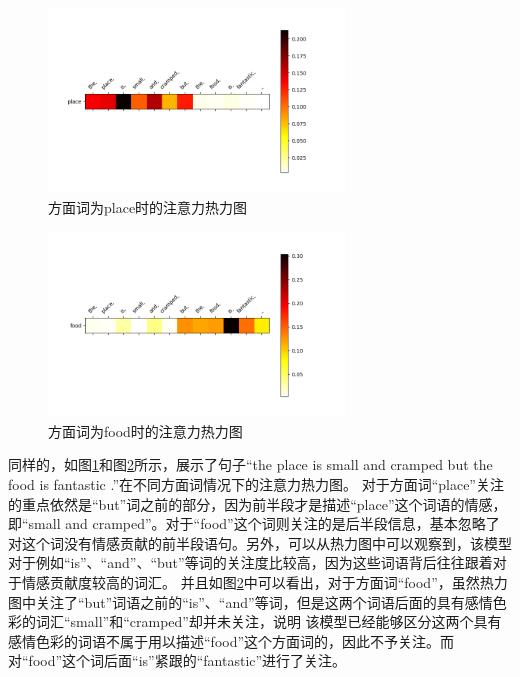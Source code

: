 \begin{figure}[htb]
    \setlength{\belowcaptionskip}{0pt}
    \centering
    \includegraphics[width=0.7\textwidth]{pic/att4_1.png}
    \caption{方面词为place时的注意力热力图}
    \label{att4_1}
\end{figure}

\begin{figure}[htb]
    \setlength{\belowcaptionskip}{0pt}
    \centering
    \includegraphics[width=0.7\textwidth]{pic/att4_2.png}
    \caption{方面词为food时的注意力热力图}
    \label{att4_2}
\end{figure}

同样的，如图\ref{att4_1}和图\ref{att4_2}所示，展示了句子“the place is small and cramped but the food is fantastic .”在不同方面词情况下的注意力热力图。
对于方面词“place”关注的重点依然是“but”词之前的部分，因为前半段才是描述“place”这个词语的情感，即“small and cramped”。对于“food”这个词则关注的是后半段信息，基本忽略了
对这个词没有情感贡献的前半段语句。另外，可以从热力图中可以观察到，该模型对于例如“is”、“and”、“but”等词的关注度比较高，因为这些词语背后往往跟着对于情感贡献度较高的词汇。
并且如图\ref{att4_2}中可以看出，对于方面词“food”，虽然热力图中关注了“but”词语之前的“is”、“and”等词，但是这两个词语后面的具有感情色彩的词汇“small”和“cramped”却并未关注，说明
该模型已经能够区分这两个具有感情色彩的词语不属于用以描述“food”这个方面词的，因此不予关注。而对“food”这个词后面“is”紧跟的“fantastic”进行了关注。

